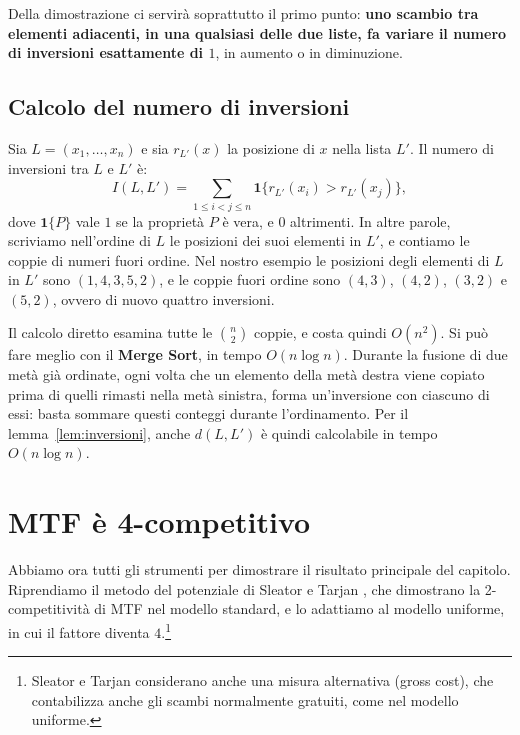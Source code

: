 Della dimostrazione ci servirà soprattutto il primo punto: \textbf{uno scambio tra elementi adiacenti, in una qualsiasi delle due liste, fa variare il numero di inversioni esattamente di $1$}, in aumento o in diminuzione.

\subsection{Calcolo del numero di inversioni}\label{sec:inversioni-calcolo}
Sia $L = (x_1, \dots, x_n)$ e sia $r_{L'}(x)$ la posizione di $x$ nella lista $L'$. Il numero di inversioni tra $L$ e $L'$ è:
\[
I(L, L') = \sum_{1 \le i < j \le n} \mathbf{1}\{r_{L'}(x_i) > r_{L'}(x_j)\},
\]
dove $\mathbf{1}\{P\}$ vale $1$ se la proprietà $P$ è vera, e $0$ altrimenti. In altre parole, scriviamo nell'ordine di $L$ le posizioni dei suoi elementi in $L'$, e contiamo le coppie di numeri fuori ordine. Nel nostro esempio le posizioni degli elementi di $L$ in $L'$ sono $(1, 4, 3, 5, 2)$, e le coppie fuori ordine sono $(4, 3)$, $(4, 2)$, $(3, 2)$ e $(5, 2)$, ovvero di nuovo quattro inversioni.

Il calcolo diretto esamina tutte le $\binom{n}{2}$ coppie, e costa quindi $O(n^2)$. Si può fare meglio con il \textbf{Merge Sort}, in tempo $O(n \log n)$. Durante la fusione di due metà già ordinate, ogni volta che un elemento della metà destra viene copiato prima di quelli rimasti nella metà sinistra, forma un'inversione con ciascuno di essi: basta sommare questi conteggi durante l'ordinamento. Per il lemma~\ref{lem:inversioni}, anche $d(L, L')$ è quindi calcolabile in tempo $O(n \log n)$.

\section{MTF è 4-competitivo}\label{sec:mtf-4}
Abbiamo ora tutti gli strumenti per dimostrare il risultato principale del capitolo. Riprendiamo il metodo del potenziale di Sleator e Tarjan \cite{Sleator1985-ListUpdate}, che dimostrano la 2-competitività di MTF nel modello standard, e lo adattiamo al modello uniforme, in cui il fattore diventa $4$.\footnote{Sleator e Tarjan considerano anche una misura alternativa (gross cost), che contabilizza anche gli scambi normalmente gratuiti, come nel modello uniforme.}

